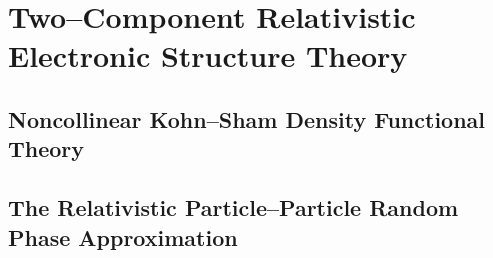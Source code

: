 \chapter{Two--Component Relativistic Electronic Structure Theory}

\section{Noncollinear Kohn--Sham Density Functional Theory}
\section{The Relativistic Particle--Particle Random Phase Approximation}

